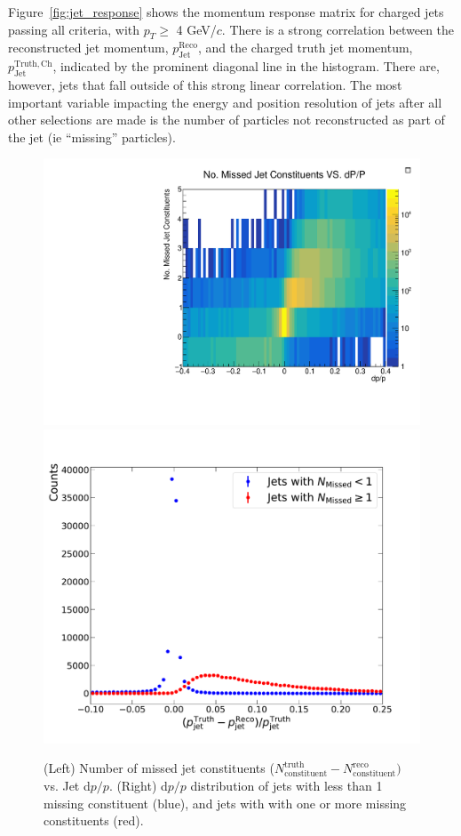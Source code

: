 Figure~\ref{fig:jet_response} shows the momentum response matrix for charged jets passing all criteria, with $p_T \ge$ 4 GeV/$c$. There is a strong correlation between the reconstructed jet momentum, $p_\mathrm{Jet}^\mathrm{Reco}$, and the charged truth jet momentum, $p_\mathrm{Jet}^\mathrm{Truth,Ch}$, indicated by the prominent diagonal line in the histogram. There are, however, jets that fall outside of this strong linear correlation. The most important variable impacting the energy and position resolution of jets after all other selections are made is the number of particles not reconstructed as part of the jet (ie ``missing'' particles).

\begin{figure}[htbp]
    \centering
    \includegraphics[width=0.42 \textwidth]{EIC_Jets/N_Miss_dPP}
    \includegraphics[width=0.42 \textwidth]{EIC_Jets/dPP_two_jets}
    \caption{(Left) Number of missed jet constituents ($N_\mathrm{constituent}^\mathrm{truth} - N_\mathrm{constituent}^\mathrm{reco})$ vs. Jet d$p/p$. (Right) d$p/p$ distribution of jets with less than 1 missing constituent (blue), and jets with with one or more missing constituents (red).}
    \label{fig:n_missed_vs_dpp}
\end{figure}

